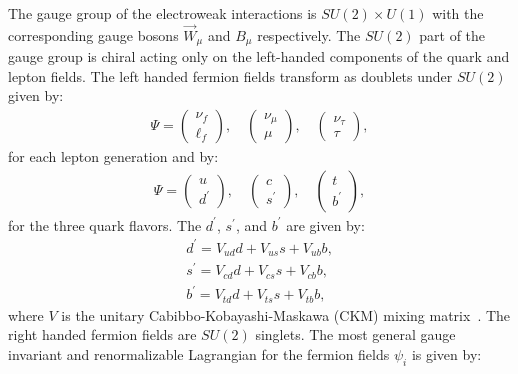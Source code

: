 The gauge group of the electroweak interactions is $SU(2) \times U(1)$ with the corresponding gauge bosons $\vec{W}_{\mu}$ and $B_{\mu}$ respectively. The $SU(2)$ part of the gauge group is chiral acting only on the left-handed components of the quark and lepton fields. The left handed fermion fields transform as doublets under $SU(2)$ given by:
\begin{eqnarray} \label{eq:doublet}
\Psi  = \left(\begin{array}{c} \nu_{f}\\ \ell_{f} \end{array} \right)\mathrm{,}  \quad \left(\begin{array}{c} \nu_{\mu}\\ \mu \end{array} \right)\mathrm{,}   \quad \left(\begin{array}{c} \nu_{\tau}\\ \tau \end{array} \right),
\end{eqnarray}   
for each lepton generation and by:
\begin{eqnarray} \label{eq:doublet_quark}
\Psi  = \left(\begin{array}{c} u \\ d^{'} \end{array} \right)\mathrm{,}  \quad \left(\begin{array}{c} c\\ s^{'} \end{array} \right)\mathrm{,}   \quad \left(\begin{array}{c} t\\ b^{'} \end{array} \right),
\end{eqnarray}   
for the three quark flavors. The $d^{'}$, $s^{'}$, and $b^{'}$ are given by:
\begin{eqnarray} \label{eq:doublet_quark}
d^{'} = V_{ud}d + V_{us}s + V_{ub}b, \\
s^{'} = V_{cd}d + V_{cs}s + V_{cb}b, \\
b^{'} = V_{td}d + V_{ts}s + V_{tb}b, 
\end{eqnarray}   
where $V$ is the unitary Cabibbo-Kobayashi-Maskawa (CKM) mixing matrix~\cite{Cabibbo:1963yz,Kobayashi:1973fv}. The right handed fermion fields are $SU(2)$ singlets. The most general gauge invariant and renormalizable Lagrangian for the fermion fields $\psi_{i}$ is given by:

